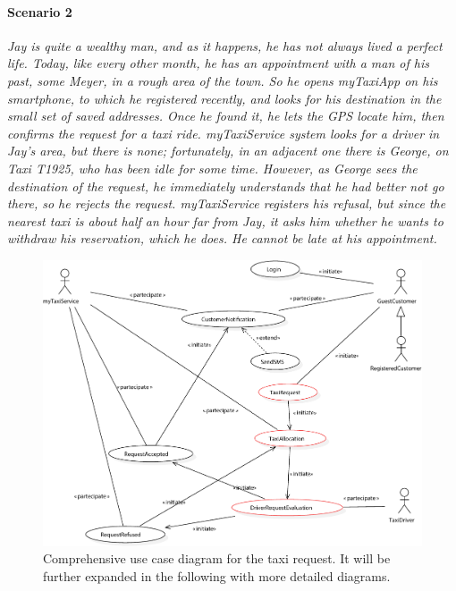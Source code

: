 \paragraph{Scenario 2}{\small\itshape Jay is quite a wealthy man, and as it happens, he has not always lived a perfect life. Today, like every other month, he has an appointment with a man of his past, some Meyer, in a rough area of the town. So he opens myTaxiApp on his smartphone, to which he registered recently, and looks for his destination in the small set of saved addresses. Once he found it, he lets the GPS locate him, then confirms the request for a taxi ride. myTaxiService system looks for a driver in Jay's area, but there is none; fortunately, in an adjacent one there is George, on Taxi T1925, who has been idle for some time. However, as George sees the destination of the request, he immediately understands that he had better not go there, so he rejects the request. myTaxiService registers his refusal, but since the nearest taxi is about half an hour far from Jay, it asks him whether he wants to withdraw his reservation, which he does. He cannot be late at his appointment.}


\begin{figure}
	\includegraphics[width=\linewidth]{img/U_TaxiRequestGLOBAL}
	\caption{Comprehensive use case diagram for the taxi request. It will be further expanded in the following with more detailed diagrams.}
\end{figure}	


